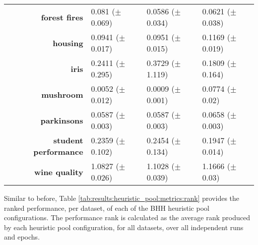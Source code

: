 \begin{table}[htb]
{\begin{tabular}{r|lll}
			\textbf{forest fires}        & \cellcolor[rgb]{ .973,  .412,  .42}0.081 ($\pm$0.069)           & \cellcolor[rgb]{ .388,  .745,  .482}0.0586 ($\pm$0.034) & \cellcolor[rgb]{ 1,  .922,  .518}0.0621 ($\pm$0.038)    \\
			\textbf{housing}             & \cellcolor[rgb]{ .388,  .745,  .482}0.0941 ($\pm$0.017)         & \cellcolor[rgb]{ 1,  .922,  .518}0.0951 ($\pm$0.015)    & \cellcolor[rgb]{ .973,  .412,  .42}0.1169 ($\pm$0.019)  \\
			\textbf{iris}                & \cellcolor[rgb]{ 1,  .922,  .518}0.2411 ($\pm$0.295)            & \cellcolor[rgb]{ .973,  .412,  .42}0.3729 ($\pm$1.119)  & \cellcolor[rgb]{ .388,  .745,  .482}0.1809 ($\pm$0.164) \\
			\textbf{mushroom}            & \cellcolor[rgb]{ 1,  .922,  .518}0.0052 ($\pm$0.012)            & \cellcolor[rgb]{ .388,  .745,  .482}0.0009 ($\pm$0.001) & \cellcolor[rgb]{ .973,  .412,  .42}0.0774 ($\pm$0.02)   \\
			\textbf{parkinsons}          & \cellcolor[rgb]{ 1,  .922,  .518}0.0587 ($\pm$0.003)            & \cellcolor[rgb]{ .388,  .745,  .482}0.0587 ($\pm$0.003) & \cellcolor[rgb]{ .973,  .412,  .42}0.0658 ($\pm$0.003)  \\
			\textbf{student performance} & \cellcolor[rgb]{ 1,  .922,  .518}0.2359 ($\pm$0.102)            & \cellcolor[rgb]{ .973,  .412,  .42}0.2454 ($\pm$0.134)  & \cellcolor[rgb]{ .388,  .745,  .482}0.1947 ($\pm$0.014) \\
			\textbf{wine quality}        & \cellcolor[rgb]{ .388,  .745,  .482}1.0827 ($\pm$0.026)         & \cellcolor[rgb]{ 1,  .922,  .518}1.1028 ($\pm$0.039)    & \cellcolor[rgb]{ .973,  .412,  .42}1.1666 ($\pm$0.03)   \\
		\end{tabular}%

	}
\end{table}%

Similar to before, Table \ref{tab:results:heuristic_pool:metrics:rank} provides the ranked performance, per dataset, of each of the \acs{BHH} heuristic pool configurations. The performance rank is calculated as the average rank produced by each heuristic pool configuration, for all datasets, over all independent runs and epochs.

